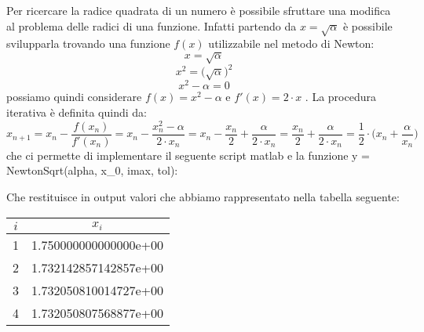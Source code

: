 Per ricercare la radice quadrata di un numero è possibile sfruttare una modifica al problema delle radici di una funzione. Infatti partendo da $x=\sqrt{\alpha}$ è possibile svilupparla trovando una funzione $f(x)$ utilizzabile nel metodo di Newton:
\[
x = \sqrt{\alpha} 
\]
\[
x^{2} = \big(\sqrt{\alpha}\big)^{2} 
\]
\[
x^{2} - \alpha = 0
\]
possiamo quindi considerare $f(x) = x^{2} - \alpha$ e $f'(x) = 2\cdot x$ . La procedura iterativa è definita quindi da:
\[
x_{n+1} = x_{n} - \frac{f(x_{n})}{f'(x_{n})} = x_{n}-\frac{x_{n}^2-\alpha}{2\cdot x_{n}} = x_{n} - \frac{x_{n}}{2} + \frac{\alpha}{2\cdot x_{n}} = \frac{x_{n}}{2}+\frac{\alpha}{2\cdot x_{n}} = \frac{1}{2} \cdot \Big(x_{n}+\frac{\alpha}{x_{n}}\Big)
\]
che ci permette di implementare il seguente script matlab e la funzione y = NewtonSqrt(alpha, x\_0, imax, tol):

Che restituisce in output valori che abbiamo rappresentato nella tabella seguente:
\begin{center}
\begin{tabular}{|c|c|}
\hline
$i$ & \( x_i \) \\
\hline
1 & 1.750000000000000e+00 \\
2 & 1.732142857142857e+00 \\
3 & 1.732050810014727e+00 \\
4 & 1.732050807568877e+00 \\
\hline
\end{tabular}\\
\end{center}